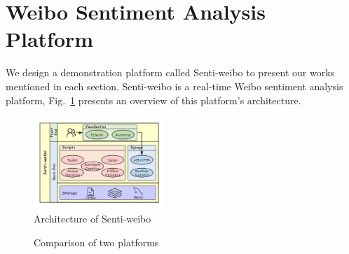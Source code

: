 \documentclass[runningheads]{llncs}
\begin{document}
\section{Weibo Sentiment Analysis Platform}


We design a demonstration platform called Senti-weibo to present our works mentioned in each section. Senti-weibo is a real-time Weibo sentiment analysis platform, Fig.~\ref{fig:Senti-weibo} presents an overview of this platform's architecture.

\begin{figure}[htp]
\begin{center}
\includegraphics[width=0.44\textwidth]{images/Architecture-of-Senti-weibo-3.png}
\caption{Architecture of Senti-weibo}
\label{fig:Senti-weibo}
\end{center}
\end{figure}

\begin{figure}[ht]
\centering  %
\caption{Comparison of two platforms}
\label{fig:topic-trend-of-huawei}
\end{figure}
\end{document}
